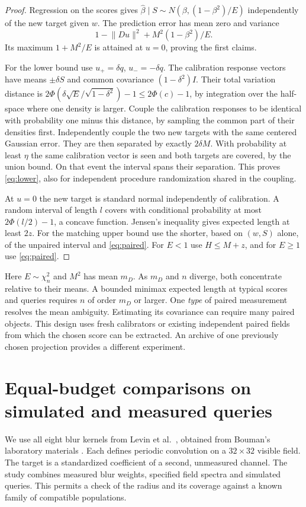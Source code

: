 \documentclass[11pt]{article}
\newcommand{\norm}[1]{\lVert #1\rVert}
\begin{document}
\begin{proof}
Regression on the scores gives $\widehat\beta\mid S\sim N(\beta,(1-\beta^2)/E)$ independently of the new target given $w$. The prediction error has mean zero and variance
\[
 1-\norm{Du}^2 + M^2(1-\beta^2)/E.
\]
Its maximum $1+M^2/E$ is attained at $u=0$, proving the first claims.

For the lower bound use $u_+=\delta q$, $u_-=-\delta q$. The calibration response vectors have means $\pm\delta S$ and common covariance $(1-\delta^2)I$. Their total variation distance is $2\Phi(\delta\sqrt{E}/\sqrt{1-\delta^2})-1\le2\Phi(c)-1$, by integration over the half-space where one density is larger. Couple the calibration responses to be identical with probability one minus this distance, by sampling the common part of their densities first. Independently couple the two new targets with the same centered Gaussian error. They are then separated by exactly $2\delta M$. With probability at least $\eta$ the same calibration vector is seen and both targets are covered, by the union bound. On that event the interval spans their separation. This proves \eqref{eq:lower}, also for independent procedure randomization shared in the coupling.

At $u=0$ the new target is standard normal independently of calibration. A random interval of length $l$ covers with conditional probability at most $2\Phi(l/2)-1$, a concave function. Jensen's inequality gives expected length at least $2z$. For the matching upper bound use the shorter, based on $(w,S)$ alone, of the unpaired interval and \eqref{eq:paired}. For $E<1$ use $H\le M+z$, and for $E\ge1$ use \eqref{eq:paired}.
\end{proof}
Here $E\sim\chi^2_n$ and $M^2$ has mean $m_D$. As $m_D$ and $n$ diverge, both concentrate relative to their means. A bounded minimax expected length at typical scores and queries requires $n$ of order $m_D$ or larger. One \emph{type} of paired measurement resolves the mean ambiguity. Estimating its covariance can require many paired objects. This design uses fresh calibrators or existing independent paired fields from which the chosen score can be extracted. An archive of one previously chosen projection provides a different experiment.

\section{Equal-budget comparisons on simulated and measured queries}\label{sec:numerics}
We use all eight blur kernels from Levin et al.\ \cite{levin}, obtained from Bouman's laboratory materials \cite{bouman}. Each defines periodic convolution on a $32\times32$ visible field. The target is a standardized coefficient of a second, unmeasured channel. The study combines measured blur weights, specified field spectra and simulated queries. This permits a check of the radius and its coverage against a known family of compatible populations.
\end{document}
